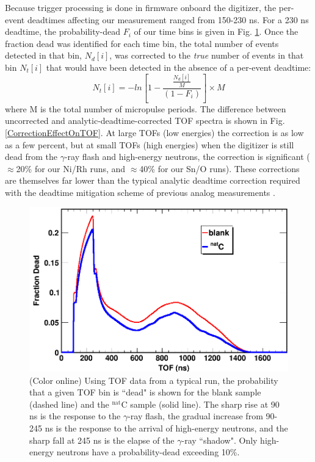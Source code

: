 \documentclass[twocolumn,secnumarabic,amssymb, nobibnotes, aps, prl,
superscriptaddress, nobalancelastpage]{revtex4}
\begin{document}
Because trigger processing is done in firmware onboard the digitizer,
the per-event deadtimes affecting our
measurement ranged from 150-230 ns. For a 230 ns deadtime, the probability-dead
$F_{i}$ of our time bins is given in Fig.
\ref{ExampleDeadtimeSpectrum}.
Once the fraction dead was identified for each time bin, the total number of
events detected in that bin, $N_{d}[i]$, was corrected to the \textit{true}
number of events in that bin $N_{t}[i]$ that would have been detected in the
absence of a
per-event deadtime:
\begin{equation}
    N_{t}[i] = -ln\left[1-\frac{\frac{N_{d}[i]}{M}}{(1-F_{i})}\right]\times M
\end{equation}
where M is the total number of micropulse periods. The difference between
uncorrected and analytic-deadtime-corrected TOF spectra is shown in Fig.
\ref{CorrectionEffectOnTOF}. At large TOFs (low energies) the correction is as low as a
few percent, but at small TOFs (high energies) when the digitizer is still dead
from the $\gamma$-ray flash and high-energy neutrons, the correction is significant
($\approx$20\% for our Ni/Rh runs, and $\approx$40\% for our Sn/O runs). These 
corrections are themselves far lower than the typical
analytic deadtime correction required with the deadtime mitigation scheme of
previous analog measurements \cite{Finlay1993,
Abfalterer2001}. %

\begin{figure}
    \includegraphics[scale=0.3]{figures/exampleDeadtimeSpectrum.png}
    \caption{(Color online) Using TOF data from a typical run, the probability that a given 
        TOF bin is ``dead" is shown for the blank sample (dashed line) and the $^{\text{nat}}$C   
        sample (solid line). The sharp rise at 90 ns is the response to the
        $\gamma$-ray flash, the gradual increase from 90-245 ns is the response to
        the arrival of high-energy neutrons, and the sharp fall at 245 ns
        is the elapse of the $\gamma$-ray ``shadow". Only high-energy neutrons
        have a probability-dead exceeding 10\%.
    }
    \label{ExampleDeadtimeSpectrum}
\end{figure}
\end{document}
